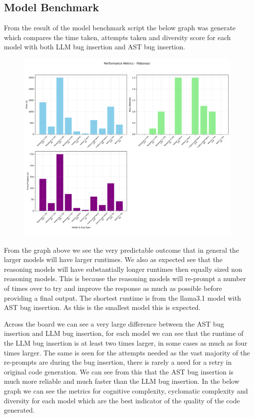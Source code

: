\documentclass[12pt]{extarticle}
\begin{document}
\subsection{Model Benchmark}

From the result of the model benchmark script the below graph was generate which compares the time taken, attempts taken and diversity score for each model with both LLM bug insertion and AST bug insertion.

\begin{figure}[H]
\centering
\includegraphics[width=0.7\linewidth]{Images/Model_Comparison_Fibbonaci.png}
\label{fig:Model_Benchmark}
\end{figure}

From the graph above we see the very predictable outcome that in general the larger models will have larger runtimes. We also as expected see that the reasoning models will have substantially longer runtimes then equally sized non reasoning models. This is because the reasoning models will re-prompt a number of times over to try and improve the response as much as possible before providing a final output. The shortest runtime is from the llama3.1 model with AST bug insertion. As this is the smallest model this is expected. 

Across the board we can see a very large difference between the AST bug insertion and LLM bug insertion, for each model we can see that the runtime of the LLM bug insertion is at least two times larger, in some cases as much as four times larger. The same is seen for the attempts needed as the vast majority of the re-prompts are during the bug insertion, there is rarely a need for a retry in original code generation. We can see from this that the AST bug insertion is much more reliable and much faster than the LLM bug insertion. In the below graph we can see the metrics for cognitive complexity, cyclomatic complexity and diversity for each model which are the best indicator of the quality of the code generated.
\end{document}
